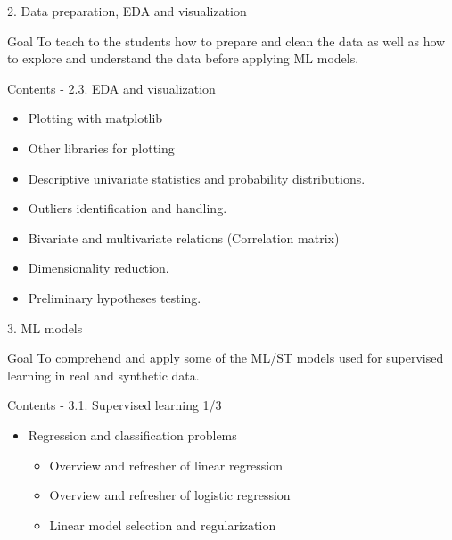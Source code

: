 \documentclass[
  ignorenonframetext,
]{beamer}
\providecommand{\tightlist}{%
  \setlength{\itemsep}{0pt}\setlength{\parskip}{0pt}}\usepackage{longtable,booktabs,array}
\begin{document}
\begin{frame}{2. Data preparation, EDA and visualization}
\protect\hypertarget{data-preparation-eda-and-visualization-2}{}
\begin{alertblock}{Goal}
\protect\hypertarget{goal-6}{}
To teach to the students how to prepare and clean the data as well as
how to explore and understand the data before applying ML models.
\end{alertblock}

\begin{exampleblock}{Contents - 2.3. EDA and visualization}
\protect\hypertarget{contents---2.3.-eda-and-visualization}{}
\begin{itemize}
\tightlist
\item
  Plotting with matplotlib
\item
  Other libraries for plotting
\item
  Descriptive univariate statistics and probability distributions.
\item
  Outliers identification and handling.
\item
  Bivariate and multivariate relations (Correlation matrix)
\item
  Dimensionality reduction.
\item
  Preliminary hypotheses testing.
\end{itemize}
\end{exampleblock}
\end{frame}

\begin{frame}{3. ML models}
\protect\hypertarget{ml-models}{}
\begin{alertblock}{Goal}
\protect\hypertarget{goal-7}{}
To comprehend and apply some of the ML/ST models used for supervised
learning in real and synthetic data.
\end{alertblock}

\begin{exampleblock}{Contents - 3.1. Supervised learning 1/3}
\protect\hypertarget{contents---3.1.-supervised-learning-13}{}
\begin{itemize}
\tightlist
\item
  Regression and classification problems

  \begin{itemize}
  \tightlist
  \item
    Overview and refresher of linear regression
  \item
    Overview and refresher of logistic regression
  \item
    Linear model selection and regularization
  \end{itemize}
\end{itemize}
\end{exampleblock}
\end{frame}
\end{document}
